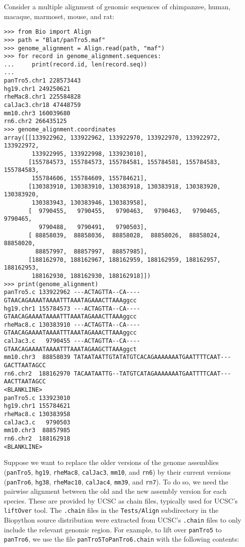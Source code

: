 Consider a multiple alignment of genomic sequences of chimpanzee, human, macaque, marmoset, mouse, and rat:
\begin{verbatim}
>>> from Bio import Align
>>> path = "Blat/panTro5.maf"
>>> genome_alignment = Align.read(path, "maf")
>>> for record in genome_alignment.sequences:
...     print(record.id, len(record.seq))
...
panTro5.chr1 228573443
hg19.chr1 249250621
rheMac8.chr1 225584828
calJac3.chr18 47448759
mm10.chr3 160039680
rn6.chr2 266435125
>>> genome_alignment.coordinates
array([[133922962, 133922962, 133922970, 133922970, 133922972, 133922972,
        133922995, 133922998, 133923010],
       [155784573, 155784573, 155784581, 155784581, 155784583, 155784583,
        155784606, 155784609, 155784621],
       [130383910, 130383910, 130383918, 130383918, 130383920, 130383920,
        130383943, 130383946, 130383958],
       [  9790455,   9790455,   9790463,   9790463,   9790465,   9790465,
          9790488,   9790491,   9790503],
       [ 88858039,  88858036,  88858028,  88858026,  88858024,  88858020,
         88857997,  88857997,  88857985],
       [188162970, 188162967, 188162959, 188162959, 188162957, 188162953,
        188162930, 188162930, 188162918]])
>>> print(genome_alignment)
panTro5.c 133922962 ---ACTAGTTA--CA----GTAACAGAAAATAAAATTTAAATAGAAACTTAAAggcc
hg19.chr1 155784573 ---ACTAGTTA--CA----GTAACAGAAAATAAAATTTAAATAGAAACTTAAAggcc
rheMac8.c 130383910 ---ACTAGTTA--CA----GTAACAGAAAATAAAATTTAAATAGAAACTTAAAggcc
calJac3.c   9790455 ---ACTAGTTA--CA----GTAACAGAAAATAAAATTTAAATAGAAGCTTAAAggct
mm10.chr3  88858039 TATAATAATTGTATATGTCACAGAAAAAAATGAATTTTCAAT---GACTTAATAGCC
rn6.chr2  188162970 TACAATAATTG--TATGTCATAGAAAAAAATGAATTTTCAAT---AACTTAATAGCC
<BLANKLINE>
panTro5.c 133923010
hg19.chr1 155784621
rheMac8.c 130383958
calJac3.c   9790503
mm10.chr3  88857985
rn6.chr2  188162918
<BLANKLINE>
\end{verbatim}
Suppose we want to replace the older versions of the genome assemblies (\verb+panTro5+, \verb+hg19+, \verb+rheMac8+, \verb+calJac3+, \verb+mm10+, and \verb+rn6+) by their current versions (\verb+panTro6+, \verb+hg38+, \verb+rheMac10+, \verb+calJac4+, \verb+mm39+, and \verb+rn7+). To do so, we need the pairwise alignment between the old and the new assembly version for each species. These are provided by UCSC as chain files, typically used for UCSC's \verb+liftOver+ tool. The \verb+.chain+ files in the \verb+Tests/Align+ subdirectory in the Biopython source distribution were extracted from UCSC's \verb+.chain+ files to only include the relevant genomic region. For example, to lift over \verb+panTro5+ to \verb+panTro6+, we use the file \verb+panTro5ToPanTro6.chain+ with the following contents:
